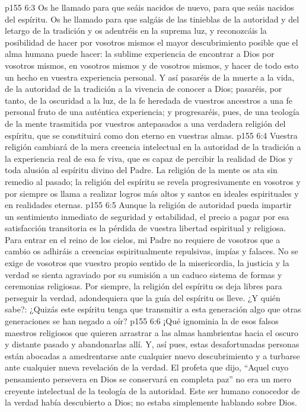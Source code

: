 \vs p155 6:3 \pc Os he llamado para que seáis nacidos de nuevo, para que seáis nacidos del espíritu. Os he llamado para que salgáis de las tinieblas de la autoridad y del letargo de la tradición y os adentréis en la suprema luz, y reconozcáis la posibilidad de hacer por vosotros mismos el mayor descubrimiento posible que el alma humana puede hacer: la sublime experiencia de encontrar a Dios por vosotros mismos, en vosotros mismos y de vosotros mismos, y hacer de todo esto un hecho en vuestra experiencia personal. Y así pasaréis de la muerte a la vida, de la autoridad de la tradición a la vivencia de conocer a Dios; pasaréis, por tanto, de la oscuridad a la luz, de la fe heredada de vuestros ancestros a una fe personal fruto de una auténtica experiencia; y progresaréis, pues, de una teología de la mente trasmitida por vuestros antepasados a una verdadera religión del espíritu, que se constituirá como don eterno en vuestras almas.
\vs p155 6:4 Vuestra religión cambiará de la mera creencia intelectual en la autoridad de la tradición a la experiencia real de esa fe viva, que es capaz de percibir la realidad de Dios y toda alusión al espíritu divino del Padre. La religión de la mente os ata sin remedio al pasado; la religión del espíritu se revela progresivamente en vosotros y por siempre os llama a realizar logros más altos y santos en ideales espirituales y en realidades eternas.
\vs p155 6:5 Aunque la religión de autoridad pueda impartir un sentimiento inmediato de seguridad y estabilidad, el precio a pagar por esa satisfacción transitoria es la pérdida de vuestra libertad espiritual y religiosa. Para entrar en el reino de los cielos, mi Padre no requiere de vosotros que a cambio os adhiráis a creencias espiritualmente repulsivas, impías y falaces. No se exige de vosotros que vuestro propio sentido de la misericordia, la justicia y la verdad se sienta agraviado por su sumisión a un caduco sistema de formas y ceremonias religiosas. Por siempre, la religión del espíritu os deja libres para perseguir la verdad, adondequiera que la guía del espíritu os lleve. ¿Y quién sabe?: ¿Quizás este espíritu tenga que transmitir a esta generación algo que otras generaciones se han negado a oír?
\vs p155 6:6 ¡Qué ignominia la de esos falsos maestros religiosos que quieren arrastrar a las almas hambrientas hacia el oscuro y distante pasado y abandonarlas allí. Y, así pues, estas desafortunadas personas están abocadas a amedrentarse ante cualquier nuevo descubrimiento y a turbarse ante cualquier nueva revelación de la verdad. El profeta que dijo, “Aquel cuyo pensamiento persevera en Dios se conservará en completa paz” no era un mero creyente intelectual de la teología de la autoridad. Este ser humano conocedor de la verdad había descubierto a Dios; no estaba simplemente hablando sobre Dios.

